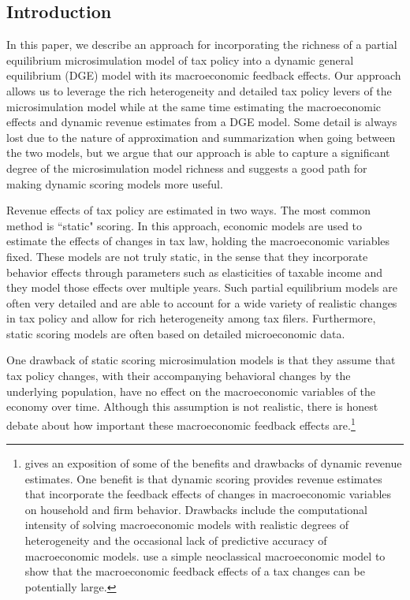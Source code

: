 \documentclass[letterpaper,12pt]{article}
\theoremstyle{definition}
\begin{document}
\begin{spacing}{1.5}

\section{Introduction}\label{SecIntro}

  In this paper, we describe an approach for incorporating the richness of a partial equilibrium microsimulation model of tax policy into a dynamic general equilibrium (DGE) model with its macroeconomic feedback effects. Our approach allows us to leverage the rich heterogeneity and detailed tax policy levers of the microsimulation model while at the same time estimating the macroeconomic effects and dynamic revenue estimates from a DGE model. Some detail is always lost due to the nature of approximation and summarization when going between the two models, but we argue that our approach is able to capture a significant degree of the microsimulation model richness and suggests a good path for making dynamic scoring models more useful.

  Revenue effects of tax policy are estimated in two ways. The most common method is ``static" scoring. In this approach, economic models are used to estimate the effects of changes in tax law, holding the macroeconomic variables fixed. These models are not truly static, in the sense that they incorporate behavior effects through parameters such as elasticities of taxable income and they model those effects over multiple years. Such partial equilibrium models are often very detailed and are able to account for a wide variety of realistic changes in tax policy and allow for rich heterogeneity among tax filers. Furthermore, static scoring models are often based on detailed microeconomic data.

  One drawback of static scoring microsimulation models is that they assume that tax policy changes, with their accompanying behavioral changes by the underlying population, have no effect on the macroeconomic variables of the economy over time. Although this assumption is not realistic, there is honest debate about how important these macroeconomic feedback effects are.\footnote{\citet{Auerbach:1996,Auerbach:2005} gives an exposition of some of the benefits and drawbacks of dynamic revenue estimates. One benefit is that dynamic scoring provides revenue estimates that incorporate the feedback effects of changes in macroeconomic variables on household and firm behavior. Drawbacks include the computational intensity of solving macroeconomic models with realistic degrees of heterogeneity and the occasional lack of predictive accuracy of macroeconomic models. \citet{MankiwWeinzierl:2006} use a simple neoclassical macroeconomic model to show that the macroeconomic feedback effects of a tax changes can be potentially large.}


\end{spacing}
\end{document}
